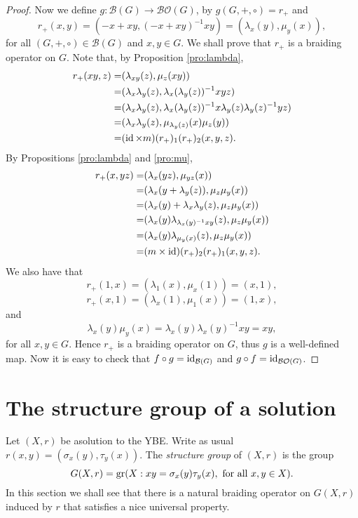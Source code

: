 \begin{proof}
Now we define $g\colon \mathcal{B}(G)\rightarrow \mathcal{BO}(G)$, by $g(G,+,\circ)=r_+$ and
\[ r_+(x,y)=(-x+xy,(-x+xy)^{-1}xy)=(\lambda_x(y),\mu_y(x)),\]
for all $(G,+,\circ)\in\mathcal{B}(G)$ and $x,y\in G$. We shall prove that $r_+$ is a braiding operator on $G$. Note that, by Proposition \ref{pro:lambda}, 
\begin{align*}
    r_+(xy,z)=&(\lambda_{xy}(z),\mu_z(xy))\\
    =&(\lambda_x\lambda_y(z),\lambda_x(\lambda_y(z))^{-1}xyz)\\
    =&(\lambda_x\lambda_y(z),\lambda_x(\lambda_y(z))^{-1}x\lambda_y(z)\lambda_y(z)^{-1}yz)\\
    =&(\lambda_x\lambda_y(z),\mu_{\lambda_y(z)}(x)\mu_z(y))\\
    =&(\operatorname{id}\times m)(r_+)_1(r_+)_2(x,y,z).
\end{align*}
By Propositions \ref{pro:lambda} and \ref{pro:mu},
\begin{align*}
    r_+(x,yz)=&(\lambda_{x}(yz),\mu_{yz}(x))\\
    =&(\lambda_x(y+\lambda_y(z)),\mu_z\mu_y(x))\\
    =&(\lambda_x(y)+\lambda_x\lambda_y(z),\mu_z\mu_y(x))\\
    =&(\lambda_x(y)\lambda_{\lambda_x(y)^{-1}xy}(z),\mu_z\mu_y(x))\\
    =&(\lambda_x(y)\lambda_{\mu_y(x)}(z),\mu_z\mu_y(x))\\
    =&(m\times \operatorname{id})(r_+)_2(r_+)_1(x,y,z).
\end{align*}
We also have that
\[ r_+(1,x)=(\lambda_1(x),\mu_x(1))=(x,1),\]
\[ r_+(x,1)=(\lambda_x(1),\mu_1(x))=(1,x),\]
and
\[ \lambda_x(y)\mu_y(x)=\lambda_x(y)\lambda_x(y)^{-1}xy=xy,\]
for all $x,y\in G$. Hence $r_+$ is a braiding operator on $G$, thus $g$ is a well-defined map. Now it is easy to check that $f\circ g=\operatorname{id}_{\mathcal{B}(G)}$ and $g\circ f=\operatorname{id}_{\mathcal{BO}(G)}$.
\end{proof}

\section{The structure group of a solution}
Let $(X,r)$ be asolution to the YBE. Write as usual $r(x,y)=(\sigma_x(y),\tau_y(x))$. The {\em structure group} of $(X,r)$ is the group
\[ G(X,r)=\operatorname{gr}(X : xy=\sigma_x(y)\tau_y(x), \text{ for all }x,y\in X).\]
In this section we shall see that there is a natural braiding operator on $G(X,r)$ induced by $r$ that satisfies a nice universal property. 

